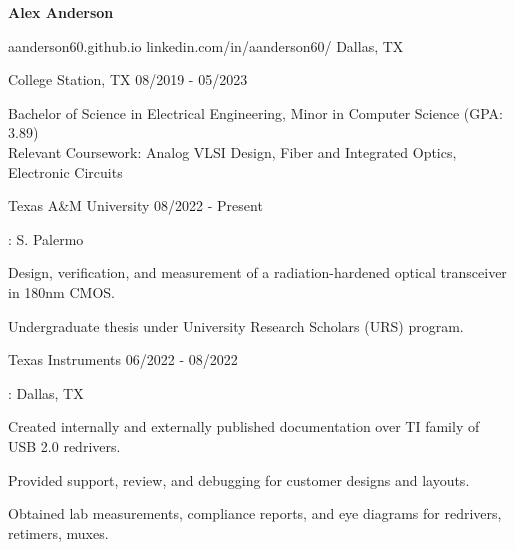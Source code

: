 \documentclass[11pt]{article}
\begin{document}
\centerline{{\Huge \bf Alex Anderson}}

\bigskip

        {aanderson60.github.io}
        {linkedin.com/in/aanderson60/}
        {Dallas, TX}


\begin{description}
\squish
{}
            {College Station, TX}
            {08/2019 - 05/2023}

Bachelor of Science in Electrical Engineering, Minor in Computer Science (GPA: 3.89) \\
Relevant Coursework: Analog VLSI Design, Fiber and Integrated Optics, Electronic Circuits

\end{description}


\begin{description}
\squish
{}
            {Texas A\&M University}
            {08/2022 - Present}

\underline{}: S. Palermo

\textbullet \space Design, verification, and measurement of a radiation-hardened optical transceiver in 180nm CMOS.

\textbullet \space Undergraduate thesis under University Research Scholars (URS) program.


\end{description}

\begin{description}
\squish
{}
            {Texas Instruments}
            {06/2022 - 08/2022}

\underline{}: Dallas, TX
            
\textbullet \space Created internally and externally published documentation over TI family of USB 2.0 redrivers.

\textbullet \space Provided support, review, and debugging for customer designs and layouts. 

\textbullet \space Obtained lab measurements, compliance reports, and eye diagrams for redrivers, retimers, muxes.
      
\end{description}
\end{document}
